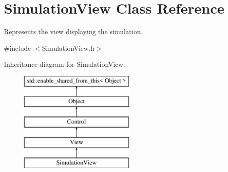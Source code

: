\hypertarget{class_simulation_view}{}\section{Simulation\+View Class Reference}
\label{class_simulation_view}


Represents the view displaying the simulation.  




{\ttfamily \#include $<$Simulation\+View.\+h$>$}

Inheritance diagram for Simulation\+View\+:\begin{figure}[H]
\begin{center}
\leavevmode
\includegraphics[height=5.000000cm]{class_simulation_view}
\end{center}
\end{figure}
